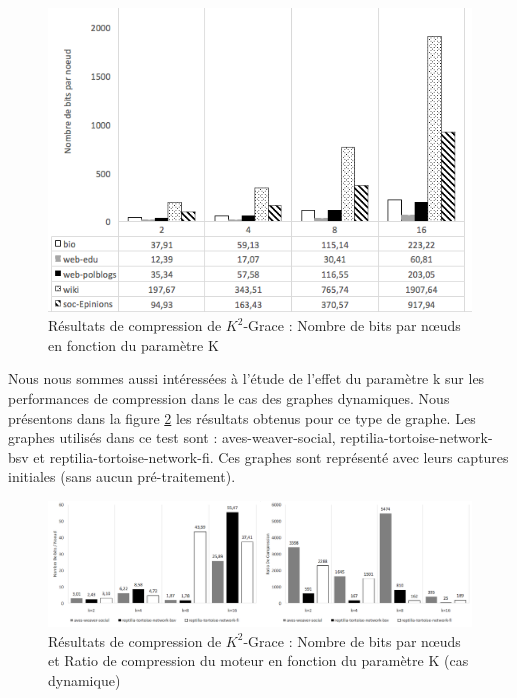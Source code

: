\begin{figure}[H]
	\centering
	\includegraphics[scale=0.8]{ressources/image/Tests/K2-paraK-NBbits.png}
	
	\caption{Résultats de compression de $K^2$-Grace : Nombre de bits par nœuds en fonction du paramètre K}
	\label{fig:K2-paraK-NBbits}
\end{figure}		


Nous nous sommes aussi intéressées à l'étude de l'effet du paramètre k sur les performances de compression dans le cas des graphes dynamiques. Nous présentons dans la figure \ref{fig:K2-dyn-paraK-NBbits} les résultats obtenus pour ce type de graphe. Les graphes utilisés dans ce test sont : aves-weaver-social, reptilia-tortoise-network-bsv et reptilia-tortoise-network-fi. Ces graphes sont représenté avec leurs captures initiales (sans aucun pré-traitement).


\begin{figure}[H]
	\centering
	\includegraphics[scale=0.38]{ressources/image/ratioik2.png}
	
	\caption{Résultats de compression de $K^2$-Grace : Nombre de bits par nœuds et Ratio de compression  du moteur en fonction du paramètre K (cas dynamique)}
	\label{fig:K2-dyn-paraK-NBbits}
\end{figure}	
	


